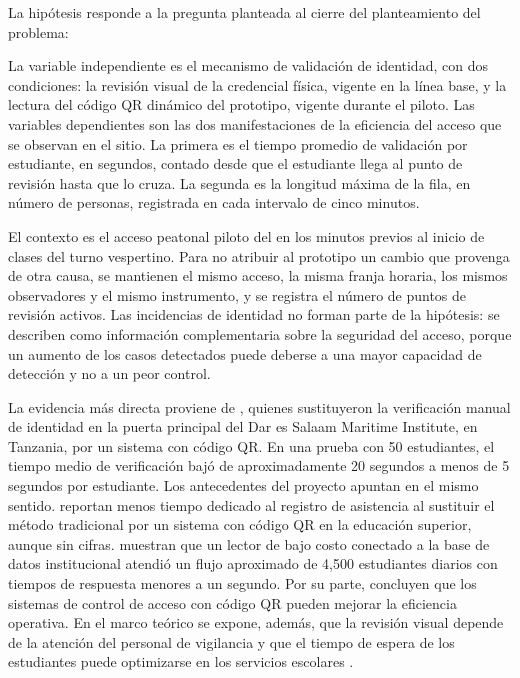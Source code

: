 La hipótesis responde a la pregunta planteada al cierre del planteamiento
del problema:
\begin{quote}
	
\end{quote}
La variable independiente es el mecanismo de validación de identidad, con dos
condiciones: la revisión visual de la credencial física, vigente en la línea
base, y la lectura del código QR dinámico del prototipo, vigente durante el
piloto. Las variables dependientes son las dos manifestaciones de la
eficiencia del acceso que se observan en el sitio. La primera es el tiempo
promedio de validación por estudiante, en segundos, contado desde que el
estudiante llega al punto de revisión hasta que lo cruza. La segunda es la
longitud máxima de la fila, en número de personas, registrada en cada
intervalo de cinco minutos.

El contexto es el acceso peatonal piloto del \tescha{} en los minutos previos
al inicio de clases del turno vespertino. Para no atribuir al prototipo un
cambio que provenga de otra causa, se mantienen el mismo acceso, la misma
franja horaria, los mismos observadores y el mismo instrumento, y se registra
el número de puntos de revisión activos. Las incidencias de identidad no
forman parte de la hipótesis: se describen como información complementaria
sobre la seguridad del acceso, porque un aumento de los casos detectados
puede deberse a una mayor capacidad de detección y no a un peor control.

La evidencia más directa proviene de \textcite{john2026qrgate}, quienes
sustituyeron la verificación manual de identidad en la puerta principal del
Dar es Salaam Maritime Institute, en Tanzania, por un sistema con código QR.
En una prueba con 50 estudiantes, el tiempo medio de verificación bajó de
aproximadamente 20 segundos a menos de 5 segundos por estudiante. Los
antecedentes del proyecto apuntan en el mismo sentido.
\textcite{cano2026sistema} reportan menos tiempo dedicado al registro de
asistencia al sustituir el método tradicional por un sistema con código QR en
la educación superior, aunque sin cifras. \textcite{tinajero2026acceso}
muestran que un lector de bajo costo conectado a la base de datos
institucional atendió un flujo aproximado de 4,500 estudiantes diarios con
tiempos de respuesta menores a un segundo. Por su parte,
\textcite{alsawi2026qracs} concluyen que los sistemas de control de acceso
con código QR pueden mejorar la eficiencia operativa. En el marco teórico se
expone, además, que la revisión visual depende de la atención del personal de
vigilancia \parencite{torres2019qr} y que el tiempo de espera de los
estudiantes puede optimizarse en los servicios escolares
\parencite{talavera2025espera}.


